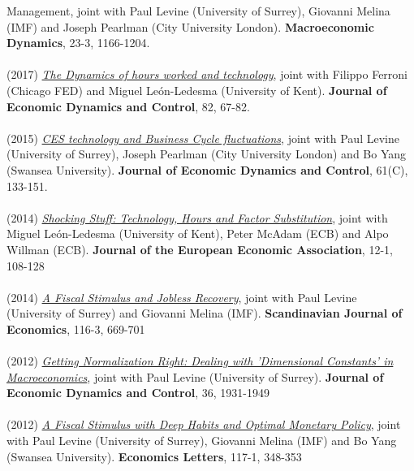 \documentclass[margin, 11pt]{res} %
\begin{document}
\begin{resume}
{{Management}}, joint with  Paul Levine (University of Surrey), Giovanni Melina (IMF) and Joseph Pearlman (City University London). \textbf{Macroeconomic Dynamics}, 23-3, 1166-1204.\\
\\
(2017) \emph{\href{http://www.sciencedirect.com/science/article/pii/S016518891730115X}{The Dynamics of hours worked and technology}}, joint with Filippo Ferroni (Chicago FED) and Miguel Le\'{o}n-Ledesma (University of Kent).
\textbf{Journal of Economic Dynamics and Control}, 82, 67-82.\\
\\
(2015) \emph{\href{https://www.sciencedirect.com/science/article/pii/S0165188915001736}{CES technology and Business Cycle fluctuations}}, joint with Paul Levine (University of Surrey), Joseph Pearlman (City University London) and Bo Yang (Swansea University).
\textbf{Journal of Economic Dynamics and Control}, 61(C), 133-151.\\
\\
(2014) \emph{\href{http://onlinelibrary.wiley.com/doi/10.1111/jeea.12038/abstract}{Shocking Stuff: Technology, Hours and Factor Substitution}}, joint with Miguel Le\'{o}n-Ledesma (University of Kent), Peter McAdam (ECB) and Alpo Willman (ECB). 
\textbf{Journal of the European Economic Association}, 12-1, 108-128\\
\\
(2014) \emph{\href{http://onlinelibrary.wiley.com/doi/10.1111/sjoe.12066/abstract}{A Fiscal Stimulus and Jobless Recovery}}, joint with  Paul Levine (University of Surrey) and Giovanni Melina (IMF). \textbf{Scandinavian Journal of Economics}, 116-3, 669-701\\
\\
(2012) \emph{\href{http://www.sciencedirect.com/science/article/pii/S0165188912001339}{Getting Normalization Right: Dealing with 'Dimensional Constants' in Macroeconomics}}, joint with Paul Levine (University of Surrey). \textbf{Journal of Economic Dynamics and Control},  36, 1931-1949\\
\\
(2012) \emph{\href{http://www.sciencedirect.com/science/article/pii/S0165176512003199}{A Fiscal Stimulus with Deep Habits and Optimal Monetary Policy}}, joint with  Paul Levine (University of Surrey), Giovanni Melina (IMF) and Bo Yang (Swansea University). \textbf{Economics Letters}, 117-1, 348-353


\end{resume}
\end{document}
